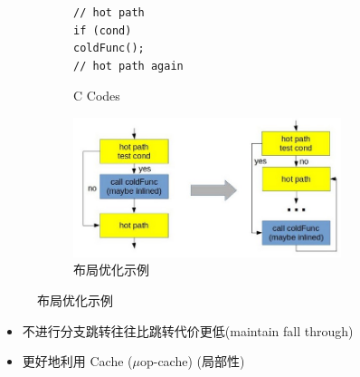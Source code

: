 \begin{figure}[H]
    \begin{subfigure}[b]{0.3\textwidth}
        \centering
        \begin{lstlisting}
// hot path
if (cond)
coldFunc();
// hot path again\end{lstlisting}
        \caption{C Codes}
    \end{subfigure}
    \begin{subfigure}[b]{0.65\textwidth}
        \centering
        \includegraphics[width=0.86\textwidth]{images/hot_cold_placement.jpg}
        \caption{布局优化示例}
    \end{subfigure}
\end{figure}
\begin{itemize}
    \item 不进行分支跳转往往比跳转代价更低(maintain fall through)
    \item 更好地利用 Cache ($\mu$op-cache) (局部性)
\end{itemize}
